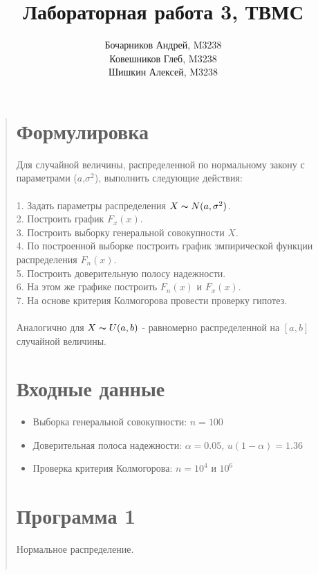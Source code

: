 \documentclass{article}
\begin{document}
\title{Лабораторная работа 3, ТВМС}
\author{
	Бочарников Андрей, M3238\\
	Ковешников Глеб, M3238\\
	Шишкин Алексей, M3238
}
\maketitle

\begin{quote}
\section{Формулировка}
	Для случайной величины, распределенной по нормальному закону с параметрами ($a$,$\sigma^2$), выполнить следующие действия:\\\\
	1. Задать параметры распределения $X \thicksim N(a, \sigma^2)$.\\
	2. Построить график $F_x(x)$.\\
	3. Построить выборку генеральной совокупности $X$.\\
	4. По построенной выборке построить график эмпирической функции распределения $F_n(x)$.\\
	5. Построить доверительную полосу надежности.\\
	6. На этом же графике построить $F_n(x)$ и $F_x(x)$.\\
	7. На основе критерия Колмогорова провести проверку гипотез.\\\\
	Аналогично для $X \thicksim U(a, b)$ - равномерно распределенной на $[a, b]$ случайной величины.
\section{Входные данные}
        \begin{itemize}
            \item Выборка генеральной совокупности: $n = 100$
	    \item Доверительная полоса надежности: $\alpha = 0.05$, $u(1 - \alpha) = 1.36$
            \item Проверка критерия Колмогорова: $n = 10^4$ и $10^6$
        \end{itemize}
\section{Программа 1}
	Нормальное распределение.\\ \\
        \begin{minipage}{\linewidth}
            
        \end{minipage}
	

\end{quote}
\end{document}
